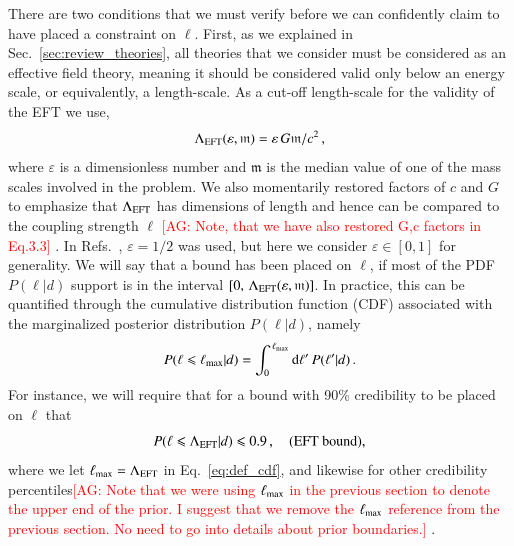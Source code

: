 \documentclass[twocolumn,
               prd,
               aps,
               superscriptaddress,
               tightenlines,
               nofootinbib,
               eqsecnum,
               amsfonts,
               amsmath,
               longbibliography]{revtex4-1}
\newcommand{\dd}{{\rm d}}
\newcommand{\agcomm}[1]{{\textcolor{red}{{[AG: #1]}} }}
\begin{document}
There are two conditions that we must verify before we can confidently claim to
have placed a constraint on $\ell$. First, as we explained in Sec.~\ref{sec:review_theories}, all theories that we
consider must be considered as an effective field theory, meaning it should be
considered valid only below an energy scale, or equivalently, a length-scale.
%
As a cut-off length-scale for the validity of the EFT we use,
%
\begin{equation}
\Lambda_{\rm EFT} (\varepsilon, \mathfrak{m}) = \varepsilon \, G \mathfrak{m} / c^2 \,,
\label{eq:def_cutoff}
\end{equation}
%
where $\varepsilon$ is a dimensionless number and $\mathfrak{m}$ is the median
value of one of the mass scales involved in the problem.
%
We also momentarily restored factors of $c$ and $G$ to emphasize that $\Lambda_{\rm EFT}$ has
dimensions of length and hence can be compared to the coupling strength $\ell$ \agcomm{Note, that we have also restored G,c factors in Eq.3.3}.
%
In Refs.~\cite{Nair:2019iur,Perkins:2021mhb,Lyu:2022gdr}, $\varepsilon = 1/2$ was used,
but here we consider $\varepsilon \in [0, 1]$ for generality.
%
We will say that a bound has been placed on $\ell$, if most of the PDF $P(\ell | d)$ support is in the interval
$[0, \, \Lambda_{\rm EFT}(\varepsilon, \mathfrak{m})]$.
%
In practice, this can be quantified through the cumulative distribution function
(CDF) associated with the marginalized posterior distribution $P(\ell | d)$, namely
%
\begin{equation}
P(\ell \leqslant \ell_{\rm max} | d) = \int_{0}^{\,\ell_{\rm max}} \dd \ell'\, P(\ell' | d) \,.
\label{eq:def_cdf}
\end{equation}
%
For instance, we will require that for a bound with 90\% credibility to be placed on $\ell$ that
%
\begin{equation}
P(\ell \leqslant \Lambda_{\rm EFT} | d) \leqslant 0.9 \,,
\quad \textrm{(EFT bound)},
\label{eq:eft_bound}
\end{equation}
%
where we let $\ell_{\rm max} = \Lambda_{\rm EFT}$ in Eq.~\eqref{eq:def_cdf}, and
likewise for other credibility percentiles\agcomm{Note that we were using $\ell_{\rm max}$
in the previous section to denote the upper end of the prior. I suggest that we remove the 
$\ell_{\rm max}$ reference from the previous section. No need to go into details about prior
boundaries.}.
\end{document}
